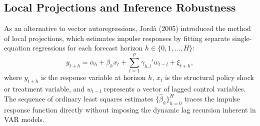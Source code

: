 \documentclass[11pt,letterpaper]{article}
\renewcommand{\_}{\pmunderscore\allowbreak}
\begin{document}
\subsection{Local Projections and Inference Robustness}\label{local-projections-and-inference-robustness}

As an alternative to vector autoregressions, Jordà (2005) introduced the method of local projections, which estimates impulse responses by fitting separate single-equation regressions for each forecast horizon \(h \in \{0, 1, \dots, H\}\):
\[y_{t+h} = \alpha_h + \beta_h x_t + \sum_{l=1}^p \gamma_{h, l}' w_{t-l} + \xi_{t+h},\]
where \(y_{t+h}\) is the response variable at horizon \(h\), \(x_t\) is the structural policy shock or treatment variable, and \(w_{t-l}\) represents a vector of lagged control variables. The sequence of ordinary least squares estimates \(\{\hat{\beta}_h\}_{h=0}^H\) traces the impulse response function directly without imposing the dynamic lag recursion inherent in VAR models.
\end{document}
